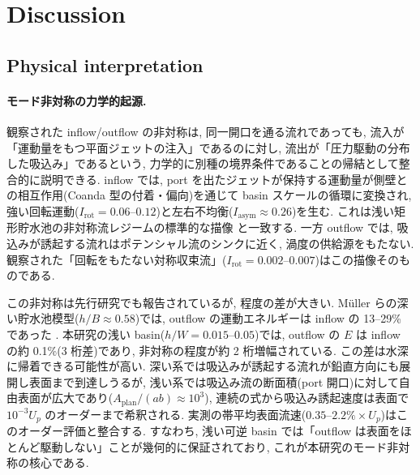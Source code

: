 
\section{Discussion}
\label{sec:discussion}

\subsection{Physical interpretation}
\label{sec:discussion_physical}

\paragraph{モード非対称の力学的起源.}
観察された inflow/outflow の非対称は, 同一開口を通る流れであっても, 流入が「運動量をもつ平面ジェットの注入」であるのに対し, 流出が「圧力駆動の分布した吸込み」であるという, 力学的に別種の境界条件であることの帰結として整合的に説明できる. inflow では, port を出たジェットが保持する運動量が側壁との相互作用(Coanda 型の付着・偏向)を通じて basin スケールの循環に変換され, 強い回転運動($I_{\mathrm{rot}} = 0.06$--$0.12$)と左右不均衡($I_{\mathrm{asym}} \approx 0.26$)を生む. これは浅い矩形貯水池の非対称流レジームの標準的な描像 \cite{dufresneClassificationFlowPatterns2010,dewalsExperimentalNumericalAnalysis2008} と一致する. 一方 outflow では, 吸込みが誘起する流れはポテンシャル流のシンクに近く, 渦度の供給源をもたない. 観察された「回転をもたない対称収束流」($I_{\mathrm{rot}} = 0.002$--$0.007$)はこの描像そのものである.

この非対称は先行研究でも報告されているが, 程度の差が大きい. M\"uller らの深い貯水池模型($h/B \approx 0.58$)では, outflow の運動エネルギーは inflow の 13--29\% であった \cite{mullerInfluenceOutflowSequences2012}. 本研究の浅い basin($h/W = 0.015$--$0.05$)では, outflow の $E$ は inflow の約 0.1\%(3 桁差)であり, 非対称の程度が約 2 桁増幅されている. この差は水深に帰着できる可能性が高い. 深い系では吸込みが誘起する流れが鉛直方向にも展開し表面まで到達しうるが, 浅い系では吸込み流の断面積(port 開口)に対して自由表面が広大であり($A_{\mathrm{plan}}/(ab) \approx 10^3$), 連続の式から吸込み誘起速度は表面で $10^{-3} U_p$ のオーダーまで希釈される. 実測の帯平均表面流速($0.35$--$2.2\% \times U_p$)はこのオーダー評価と整合する. すなわち, 浅い可逆 basin では「outflow は表面をほとんど駆動しない」ことが幾何的に保証されており, これが本研究のモード非対称の核心である.

